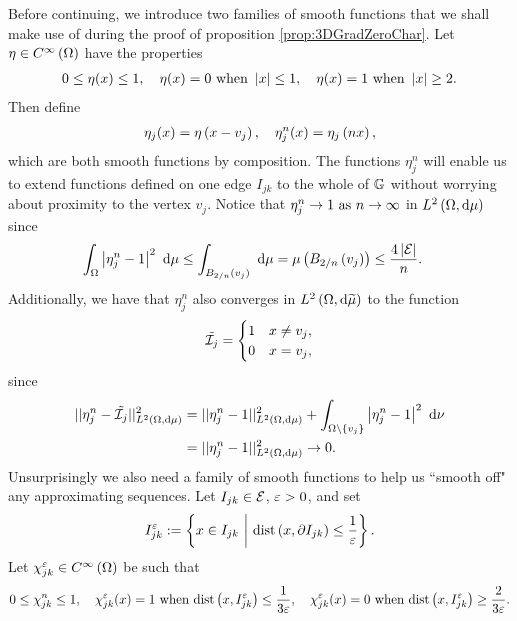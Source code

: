 Before continuing, we introduce two families of smooth functions that we shall make use of during the proof of proposition \ref{prop:3DGradZeroChar}.
Let $\eta\in C^{\infty}\left( \Omega \right)$ have the properties
\begin{align*}
	0 \leq \eta(x) \leq 1, \quad
	\eta(x) = 0 \text{ when } \left\lvert x \right\rvert \leq 1, \quad
	\eta(x) = 1 \text{ when } \left\lvert x \right\rvert \geq 2.
\end{align*}
Then define
\begin{align*}
	\eta_j(x) = \eta\left( x-v_j \right), \quad
	\eta_j^n(x) = \eta_j\left( nx \right),
\end{align*}
which are both smooth functions by composition.
The functions $\eta_j^n$ will enable us to extend functions defined on one edge $I_{jk}$ to the whole of $\mathbb{G}$ without worrying about proximity to the vertex $v_j$.
Notice that $\eta_j^n\rightarrow 1 \ \text{as} \ n \rightarrow\infty$ in $L^{2}\left( \Omega,\mathrm{d}\mu \right)$ since
\begin{align*}
	\int_{\Omega} \left\lvert \eta_j^n - 1 \right\rvert^2  \ \mathrm{d}\mu &\leq
	\int_{ B_{2/n}\left( v_j \right) } \ \mathrm{d}\mu
	= \mu\left(  B_{2/n}\left( v_j \right)  \right) \leq \frac{4\left\lvert \mathcal{E} \right\rvert}{n}.
\end{align*}
Additionally, we have that $\eta_j^n$ also converges in $L^{2}\left( \Omega,\mathrm{d}\widetilde{\mu} \right)$ to the function
\begin{align*}
	\tilde{\mathcal{I}_{j}} = \begin{cases} 1 & x\neq v_j, \\ 0 & x=v_j, \end{cases}
\end{align*}
since
\begin{align*}
	\lvert\lvert \eta_j^n - \tilde{\mathcal{I}_{j}} \rvert\rvert_{L^{2}\left( \Omega,\mathrm{d}\mu \right)}^2
	&= \lvert\lvert \eta_j^n - 1 \rvert\rvert_{L^{2}\left( \Omega,\mathrm{d}\mu \right)}^2
	+ \int_{\Omega\setminus\left\{ v_j \right\}} \left\lvert \eta_j^n - 1 \right\rvert^2  \ \mathrm{d}\nu \\
	&= \lvert\lvert \eta_j^n - 1 \rvert\rvert_{L^{2}\left( \Omega,\mathrm{d}\mu \right)}^2 \rightarrow 0.
\end{align*}
Unsurprisingly we also need a family of smooth functions to help us ``smooth off" any approximating sequences.
Let $I_{jk}\in\mathcal{E}$, $\varepsilon>0$, and set
\begin{align} \label{eq:ShortenedEdgeDef}
	I_{jk}^\varepsilon := \left\{  x\in I_{jk} \ \middle\vert \  \mathrm{dist}\left( x,\partial I_{jk} \right)\leq\frac{1}{\varepsilon}  \right\}.
\end{align}
Let $\chi_{jk}^\varepsilon\in C^{\infty}\left( \Omega \right)$ be such that
\begin{align*}
	0 \leq \chi_{jk}^n \leq 1, \quad
	\chi_{jk}^\varepsilon(x) = 1 \text{ when } \mathrm{dist}\left( x, I_{jk}^\varepsilon \right)\leq \frac{1}{3\varepsilon}, \quad
	\chi_{jk}^\varepsilon(x) = 0 \text{ when } \mathrm{dist}\left( x, I_{jk}^\varepsilon \right)\geq \frac{2}{3\varepsilon}.
\end{align*}
